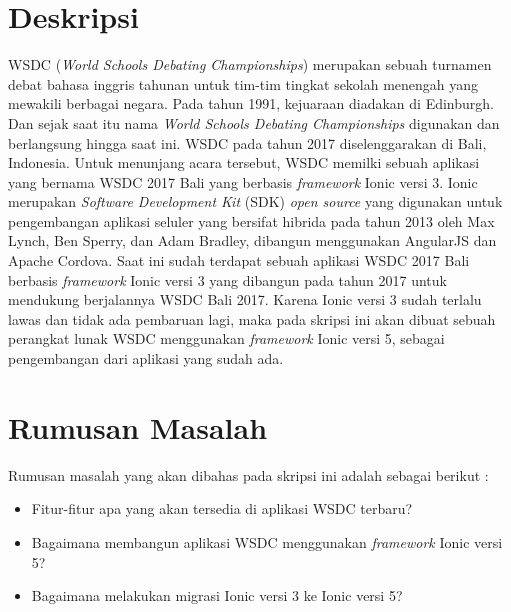 \documentclass[a4paper,twoside]{article}
\begin{document}
\title{\@judultopik}
\author{\nama \textendash \@npm} 

\newcommand{\nama}{Rajasa Cikal Maulana Solihin}
\newcommand{\@npm}{2017730084}
\newcommand{\@judultopik}{Pembuatan Ulang Aplikasi WSDC 2017 Bali dengan Ionic 5} %
\newcommand{\jumpemb}{1} %
\newcommand{\tanggal}{12/10/2021}


\maketitle


\section{Deskripsi}
WSDC ({\it World Schools Debating Championships}) merupakan sebuah turnamen debat bahasa inggris tahunan untuk tim-tim tingkat sekolah menengah yang mewakili berbagai negara. Pada tahun 1991, kejuaraan diadakan di Edinburgh. Dan sejak saat itu nama {\it World Schools Debating Championships} digunakan dan berlangsung hingga saat ini. WSDC pada tahun 2017 diselenggarakan di Bali, Indonesia. Untuk menunjang acara tersebut, WSDC memilki sebuah aplikasi yang bernama WSDC 2017 Bali yang berbasis {\it framework} Ionic versi 3. Ionic merupakan {\it Software Development Kit} (SDK) {\it open source} yang digunakan untuk pengembangan aplikasi seluler yang bersifat hibrida pada tahun 2013 oleh Max Lynch, Ben Sperry, dan Adam Bradley, dibangun menggunakan AngularJS dan Apache Cordova. Saat ini sudah terdapat sebuah aplikasi WSDC 2017 Bali berbasis {\it framework} Ionic versi 3 yang dibangun pada tahun 2017 untuk mendukung berjalannya WSDC Bali 2017. Karena Ionic versi 3 sudah terlalu lawas dan tidak ada pembaruan lagi, maka pada skripsi ini akan dibuat sebuah perangkat lunak WSDC menggunakan {\it framework} Ionic versi 5, sebagai pengembangan dari aplikasi yang sudah ada. 

\section{Rumusan Masalah}
Rumusan masalah yang akan dibahas pada skripsi ini adalah sebagai berikut :
\begin{itemize}
	\item Fitur-fitur apa yang akan tersedia di aplikasi WSDC terbaru?
	\item Bagaimana membangun aplikasi WSDC menggunakan {\it framework} Ionic versi 5?
	\item Bagaimana melakukan migrasi Ionic versi 3 ke Ionic versi 5?
\end{itemize}
\end{document}
